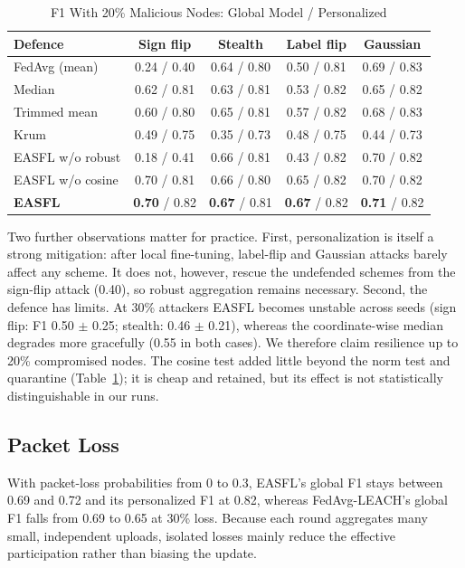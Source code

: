 \documentclass[journal]{IEEEtran}
\begin{document}
\begin{table}[t]
\caption{F1 With 20\% Malicious Nodes: Global Model / Personalized}\label{tab:pois}
\centering\scriptsize
\setlength{\tabcolsep}{3pt}
\begin{tabular}{@{}lcccc@{}}
\toprule
Defence & Sign flip & Stealth & Label flip & Gaussian\\
\midrule
FedAvg (mean) & 0.24 / 0.40 & 0.64 / 0.80 & 0.50 / 0.81 & 0.69 / 0.83\\
Median & 0.62 / 0.81 & 0.63 / 0.81 & 0.53 / 0.82 & 0.65 / 0.82\\
Trimmed mean & 0.60 / 0.80 & 0.65 / 0.81 & 0.57 / 0.82 & 0.68 / 0.83\\
Krum & 0.49 / 0.75 & 0.35 / 0.73 & 0.48 / 0.75 & 0.44 / 0.73\\
EASFL w/o robust & 0.18 / 0.41 & 0.66 / 0.81 & 0.43 / 0.82 & 0.70 / 0.82\\
EASFL w/o cosine & 0.70 / 0.81 & 0.66 / 0.80 & 0.65 / 0.82 & 0.70 / 0.82\\
\textbf{EASFL} & \textbf{0.70} / 0.82 & \textbf{0.67} / 0.81 & \textbf{0.67} / 0.82 & \textbf{0.71} / 0.82\\
\bottomrule
\end{tabular}
\end{table}

Two further observations matter for practice. First, personalization is itself a strong mitigation: after local fine-tuning, label-flip and Gaussian attacks barely affect any scheme. It does not, however, rescue the undefended schemes from the sign-flip attack (0.40), so robust aggregation remains necessary. Second, the defence has limits. At 30\% attackers EASFL becomes unstable across seeds (sign flip: F1 0.50 $\pm$ 0.25; stealth: 0.46 $\pm$ 0.21), whereas the coordinate-wise median degrades more gracefully (0.55 in both cases). We therefore claim resilience up to 20\% compromised nodes. The cosine test added little beyond the norm test and quarantine (Table~\ref{tab:pois}); it is cheap and retained, but its effect is not statistically distinguishable in our runs.

\subsection{Packet Loss}
With packet-loss probabilities from 0 to 0.3, EASFL's global F1 stays between 0.69 and 0.72 and its personalized F1 at 0.82, whereas FedAvg-LEACH's global F1 falls from 0.69 to 0.65 at 30\% loss. Because each round aggregates many small, independent uploads, isolated losses mainly reduce the effective participation rather than biasing the update.
\end{document}
